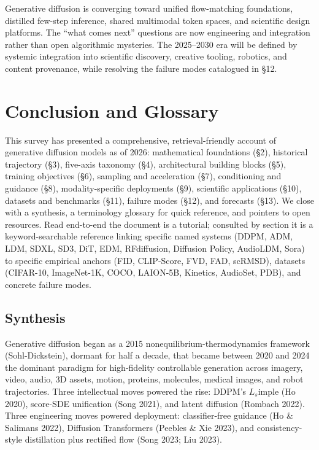 Generative diffusion is converging toward unified flow-matching foundations, distilled few-step inference, shared multimodal token spaces, and scientific design platforms. The ``what comes next'' questions are now engineering and integration rather than open algorithmic mysteries. The 2025--2030 era will be defined by systemic integration into scientific discovery, creative tooling, robotics, and content provenance, while resolving the failure modes catalogued in §12.

\section{Conclusion and Glossary}\label{conclusion-and-glossary}

This survey has presented a comprehensive, retrieval-friendly account of generative diffusion models as of 2026: mathematical foundations (§2), historical trajectory (§3), five-axis taxonomy (§4), architectural building blocks (§5), training objectives (§6), sampling and acceleration (§7), conditioning and guidance (§8), modality-specific deployments (§9), scientific applications (§10), datasets and benchmarks (§11), failure modes (§12), and forecasts (§13). We close with a synthesis, a terminology glossary for quick reference, and pointers to open resources. Read end-to-end the document is a tutorial; consulted by section it is a keyword-searchable reference linking specific named systems (DDPM, ADM, LDM, SDXL, SD3, DiT, EDM, RFdiffusion, Diffusion Policy, AudioLDM, Sora) to specific empirical anchors (FID, CLIP-Score, FVD, FAD, scRMSD), datasets (CIFAR-10, ImageNet-1K, COCO, LAION-5B, Kinetics, AudioSet, PDB), and concrete failure modes.

\subsection{Synthesis}\label{synthesis}

Generative diffusion began as a 2015 nonequilibrium-thermodynamics framework (Sohl-Dickstein), dormant for half a decade, that became between 2020 and 2024 the dominant paradigm for high-fidelity controllable generation across imagery, video, audio, 3D assets, motion, proteins, molecules, medical images, and robot trajectories. Three intellectual moves powered the rise: DDPM's \(L_s\)imple (Ho 2020), score-SDE unification (Song 2021), and latent diffusion (Rombach 2022). Three engineering moves powered deployment: classifier-free guidance (Ho \& Salimans 2022), Diffusion Transformers (Peebles \& Xie 2023), and consistency-style distillation plus rectified flow (Song 2023; Liu 2023).

